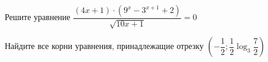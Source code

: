 \begin{ex}
	\begin{condition}
		\begin{enumcols}[label=\asbuk*)]
			\item Решите уравнение \( \dfrac{(4x+1)\cdot\left(9^x - 3^{x+1} + 2\right)}{\sqrt{10x + 1} }= 0 \)
			\item Найдите все корни уравнения, принадлежащие отрезку \( \left(-\dfrac{1}{2};\dfrac{1}{2}\log_3 \dfrac{7}{2}\right) \)
		\end{enumcols}
	\end{condition}
\end{ex}